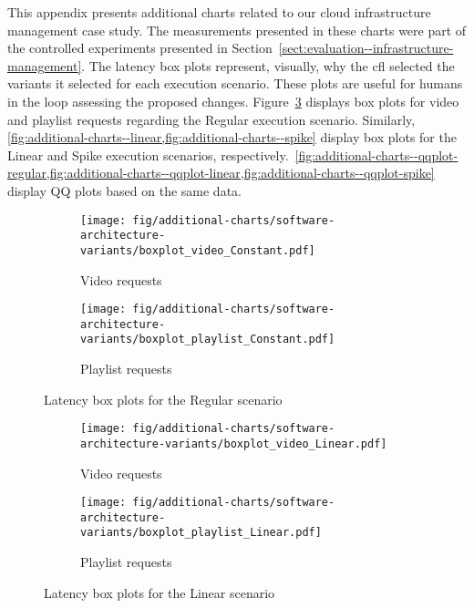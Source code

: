\label{appendix:additional-charts}

This appendix presents additional charts related to our cloud infrastructure management case study. The measurements presented in these charts were part of the controlled experiments presented in Section~\ref{sect:evaluation--infrastructure-management}. The latency box plots represent, visually, why the \gls{cfl} selected the variants it selected for each execution scenario. These plots are useful for humans in the loop assessing the proposed changes. Figure~\ref{fig:additional-charts--regular} displays box plots for video and playlist requests regarding the Regular execution scenario. Similarly, \cref{fig:additional-charts--linear,fig:additional-charts--spike} display box plots for the Linear and Spike execution scenarios, respectively.~\cref{fig:additional-charts--qqplot-regular,fig:additional-charts--qqplot-linear,fig:additional-charts--qqplot-spike} display QQ plots based on the same data.

\begin{figure}[h]
	\centering
	\begin{subfigure}[b]{0.49\textwidth}
		\centering
		\texttt{[image: fig/additional-charts/software-architecture-variants/boxplot\_video\_Constant.pdf]}
		\caption{Video requests}
		\label{fig:additional-charts--video-regular}
	\end{subfigure}
	\begin{subfigure}[b]{0.49\textwidth}
		\centering
		\texttt{[image: fig/additional-charts/software-architecture-variants/boxplot\_playlist\_Constant.pdf]}
		\caption{Playlist requests}
		\label{fig:additional-charts--playlist-regular}
	\end{subfigure}
	\caption{Latency box plots for the Regular scenario}
	\label{fig:additional-charts--regular}
\end{figure}

\begin{figure}[h]
	\centering
	\begin{subfigure}[b]{0.8\textwidth}
		\centering
		\texttt{[image: fig/additional-charts/software-architecture-variants/boxplot\_video\_Linear.pdf]}
		\caption{Video requests}
		\label{fig:additional-charts--video-linear}
	\end{subfigure}
	\begin{subfigure}[b]{0.8\textwidth}
		\centering
		\texttt{[image: fig/additional-charts/software-architecture-variants/boxplot\_playlist\_Linear.pdf]}
		\caption{Playlist requests}
		\label{fig:additional-charts--playlist-linear}
	\end{subfigure}
	\caption{Latency box plots for the Linear scenario}
	\label{fig:additional-charts--linear}
\end{figure}

